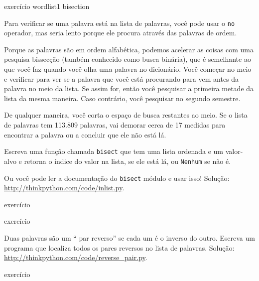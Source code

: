 \documentclass[10pt]{book}
\begin{document}
\begin{} exercício
\label{} wordlist1
\label{} bisection

Para verificar se uma palavra está na lista de palavras, você pode usar
o {\tt no} operador, mas seria lento porque ele procura
através das palavras de ordem.

Porque as palavras são em ordem alfabética, podemos acelerar as coisas
com uma pesquisa bissecção (também conhecido como busca binária), que é
semelhante ao que você faz quando você olha uma palavra no dicionário. Você
começar no meio e verificar para ver se a palavra que você está procurando
para vem antes da palavra no meio da lista. Se assim for, então você
pesquisar a primeira metade da lista da mesma maneira. Caso contrário, você pesquisar
no segundo semestre.

De qualquer maneira, você corta o espaço de busca restantes ao meio. Se o
lista de palavras tem 113.809 palavras, vai demorar cerca de 17 medidas para
encontrar a palavra ou a concluir que ele não está lá.

Escreva uma função chamada {\tt bisect} que tem uma lista ordenada
e um valor-alvo e retorna o índice do valor
na lista, se ele está lá, ou {\tt Nenhum} se não é.

Ou você pode ler a documentação do {\tt bisect} módulo
e usar isso! Solução: \url{http://thinkpython.com/code/inlist.py}.

\end{} exercício

\begin{} exercício

Duas palavras são um `` par reverso'' se cada um é o inverso do
outro. Escreva um programa que localiza todos os pares reversos no
lista de palavras. Solução: \url{http://thinkpython.com/code/reverse_pair.py}.

\end{} exercício
\end{document}
